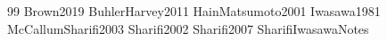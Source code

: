 \documentclass[11pt]{article}
\begin{document}

\begin{thebibliography}{99}
Brown2019
BuhlerHarvey2011
HainMatsumoto2001
Iwasawa1981
McCallumSharifi2003
Sharifi2002
Sharifi2007
SharifiIwasawaNotes
\end{thebibliography}
\end{document}
